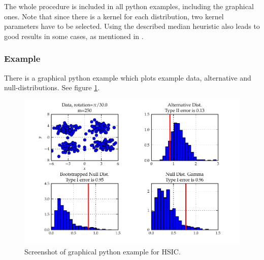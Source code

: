 The whole procedure is included in all python examples, including the graphical ones. Note that since there is a kernel for each distribution, two kernel parameters have to be selected. Using the described median heuristic also leads to good results in some cases, as mentioned in \citep{Gretton2008d}.

\subsubsection{Example}
There is a graphical python example which plots example data, alternative and null-distributions. See figure \ref{fig:statistical_testing-hsic}.

\begin{figure}\centering
		\includegraphics{fig/statistical_testing/hsic}
		\caption{Screenshot of graphical python example for HSIC.}
		\label{fig:statistical_testing-hsic}
\end{figure}